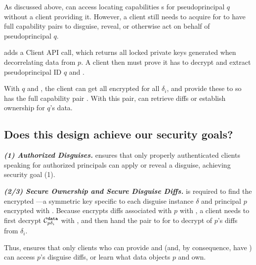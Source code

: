 As discussed above, \sys can access locating capabilities s for pseudoprincipal $q$ without a
client providing it. 
%
However, a client still needs to acquire  for \sys to have full capability pairs
to disguise, reveal, or otherwise act on behalf of pseudoprincipal $q$.

\sys adds a  Client API call, which returns all locked private
keys  generated when decorrelating data from $p$.
A client then must prove it has  to decrypt  and extract pseudoprincipal ID $q$ and .

With $q$ and , the client can get all encrypted  for all $\delta_i$, and
provide these to \sys so \sys has the full capability pair . With
this pair, \sys can retrieve diffs or establish ownership for $q$'s data.


\subsection{Does this design achieve our security goals?}
\label{sec:achievegoals}
\vspace{6pt}\noindent\textbf{\emph{(1) Authorized Disguises.}}
\sys ensures that only properly authenticated clients speaking for authorized principals can apply or
reveal a disguise, achieving security goal (1).

\vspace{6pt}\noindent\textbf{\emph{(2/3) Secure Ownership and Secure Disguise Diffs.}}
 is required to find the encrypted ---a symmetric key
specific to each disguise instance $\delta$ and principal $p$ encrypted with .
Because \sys encrypts  diffs associated with $p$ with , a client
needs to first decrypt $\mathcal{C}^{\texttt{data}}_{p\delta_i}$ with , and then hand the pair 
to \sys for \sys to decrypt of $p$'s diffs from $\delta_i$.

Thus, \sys ensures that only clients who can provide  and  (and,
by consequence, have ) can access $p$'s disguise diffs, or learn what data objects $p$ and
own. 


